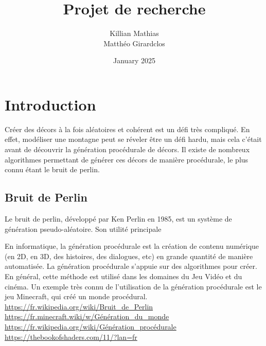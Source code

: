 \documentclass{article}
\title{Projet de recherche}
\author{Killian Mathias\\ Matthéo Girardclos}
\date{January 2025}
\begin{document}
\maketitle

\section{Introduction}

Créer des décors à la fois aléatoires et cohérent est un défi très compliqué. En effet, modéliser une montagne peut se réveler être un défi hardu, mais cela c'était avant de découvrir la génération procédurale de décors. Il existe de nombreux algorithmes permettant de générer ces décors de manière procédurale, le plus connu étant le bruit de perlin.

\subsection{Bruit de Perlin}

Le bruit de perlin, développé par Ken Perlin en 1985, est un système de génération pseudo-aléatoire. Son utilité principale

En informatique, la génération procédurale est la création de contenu numérique (en 2D, en 3D, des histoires, des dialogues, etc) en grande quantité de manière automatisée. La génération procédurale s'appuie sur des algorithmes pour créer.
En général, cette méthode est utilisé dans les domaines du Jeu Vidéo et du cinéma. Un exemple très connu de l'utilisation de la génération procédurale est le jeu Minecraft, qui créé un monde procédural.\\
\url{https://fr.wikipedia.org/wiki/Bruit_de_Perlin}\\
\url{https://fr.minecraft.wiki/w/Génération_du_monde}\\
\url{https://fr.wikipedia.org/wiki/Génération_procédurale}\\
\url{https://thebookofshaders.com/11/?lan=fr}
\end{document}
